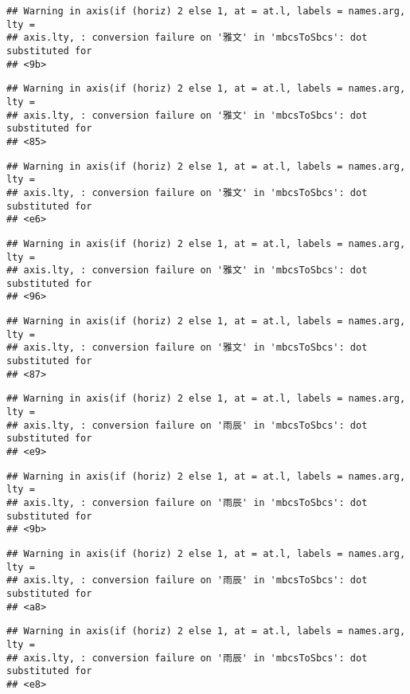 \documentclass[
]{article}
\begin{document}
\begin{verbatim}
## Warning in axis(if (horiz) 2 else 1, at = at.l, labels = names.arg, lty =
## axis.lty, : conversion failure on '雅文' in 'mbcsToSbcs': dot substituted for
## <9b>
\end{verbatim}

\begin{verbatim}
## Warning in axis(if (horiz) 2 else 1, at = at.l, labels = names.arg, lty =
## axis.lty, : conversion failure on '雅文' in 'mbcsToSbcs': dot substituted for
## <85>
\end{verbatim}

\begin{verbatim}
## Warning in axis(if (horiz) 2 else 1, at = at.l, labels = names.arg, lty =
## axis.lty, : conversion failure on '雅文' in 'mbcsToSbcs': dot substituted for
## <e6>
\end{verbatim}

\begin{verbatim}
## Warning in axis(if (horiz) 2 else 1, at = at.l, labels = names.arg, lty =
## axis.lty, : conversion failure on '雅文' in 'mbcsToSbcs': dot substituted for
## <96>
\end{verbatim}

\begin{verbatim}
## Warning in axis(if (horiz) 2 else 1, at = at.l, labels = names.arg, lty =
## axis.lty, : conversion failure on '雅文' in 'mbcsToSbcs': dot substituted for
## <87>
\end{verbatim}

\begin{verbatim}
## Warning in axis(if (horiz) 2 else 1, at = at.l, labels = names.arg, lty =
## axis.lty, : conversion failure on '雨辰' in 'mbcsToSbcs': dot substituted for
## <e9>
\end{verbatim}

\begin{verbatim}
## Warning in axis(if (horiz) 2 else 1, at = at.l, labels = names.arg, lty =
## axis.lty, : conversion failure on '雨辰' in 'mbcsToSbcs': dot substituted for
## <9b>
\end{verbatim}

\begin{verbatim}
## Warning in axis(if (horiz) 2 else 1, at = at.l, labels = names.arg, lty =
## axis.lty, : conversion failure on '雨辰' in 'mbcsToSbcs': dot substituted for
## <a8>
\end{verbatim}

\begin{verbatim}
## Warning in axis(if (horiz) 2 else 1, at = at.l, labels = names.arg, lty =
## axis.lty, : conversion failure on '雨辰' in 'mbcsToSbcs': dot substituted for
## <e8>
\end{verbatim}
\end{document}
